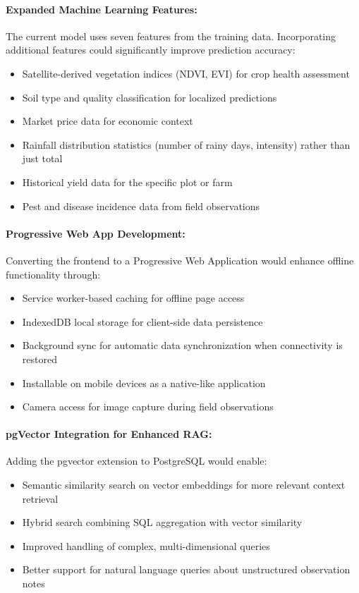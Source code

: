 \paragraph{Expanded Machine Learning Features:}
The current model uses seven features from the training data. Incorporating additional features could significantly improve prediction accuracy:
\begin{itemize}
  \item Satellite-derived vegetation indices (NDVI, EVI) for crop health assessment
  \item Soil type and quality classification for localized predictions
  \item Market price data for economic context
  \item Rainfall distribution statistics (number of rainy days, intensity) rather than just total
  \item Historical yield data for the specific plot or farm
  \item Pest and disease incidence data from field observations
\end{itemize}

\paragraph{Progressive Web App Development:}
Converting the frontend to a Progressive Web Application would enhance offline functionality through:
\begin{itemize}
  \item Service worker-based caching for offline page access
  \item IndexedDB local storage for client-side data persistence
  \item Background sync for automatic data synchronization when connectivity is restored
  \item Installable on mobile devices as a native-like application
  \item Camera access for image capture during field observations
\end{itemize}

\paragraph{pgVector Integration for Enhanced RAG:}
Adding the pgvector extension to PostgreSQL would enable:
\begin{itemize}
  \item Semantic similarity search on vector embeddings for more relevant context retrieval
  \item Hybrid search combining SQL aggregation with vector similarity
  \item Improved handling of complex, multi-dimensional queries
  \item Better support for natural language queries about unstructured observation notes
\end{itemize}

